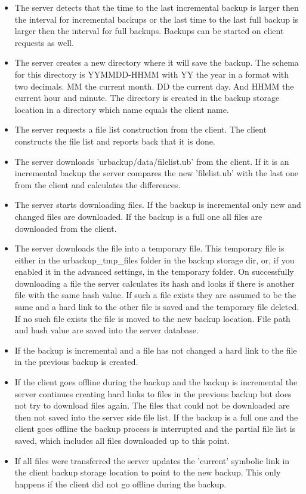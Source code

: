 \documentclass[a4paper,10pt]{article}
\begin{document}
\begin{itemize}
\item The server detects that the time to the last incremental backup is larger then the interval for incremental backups or the last time to the last full backup is larger then the interval for full backups. Backups can be started on client requests as well.
\item The server creates a new directory where it will save the backup. The schema for this directory is YYMMDD-HHMM with YY the year in a format with two decimals. MM the current month. DD the current day. And HHMM the current hour and minute. The directory is created in the backup storage location in a directory which name equals the client name.
\item The server requests a file list construction from the client. The client constructs the file list and reports back that it is done. 
\item The server downloads 'urbackup/data/filelist.ub' from the client. If it is an incremental backup the server compares the new 'filelist.ub' with the last one from the client and calculates the differences.
\item The server starts downloading files. If the backup is incremental only new and changed files are downloaded. If the backup is a full one all files are downloaded from the client.
\item The server downloads the file into a temporary file. This temporary file is either in the
urbackup\_tmp\_files folder in the backup storage dir, or, if you enabled it in the advanced
settings, in the temporary folder.
On successfully downloading a file the server calculates its hash and looks if there is another file with the same hash value.
If such a file exists they are assumed to be the same and a hard link to the other file is saved and the temporary file deleted. If no such file exists the file is moved to the new backup location. File path and hash value are saved into the server database.
\item If the backup is incremental and a file has not changed a hard link to the file in the previous backup is created.
\item If the client goes offline during the backup and the backup is incremental the server continues creating hard links to files in the previous backup but does not try to download files again. The files that could not be downloaded are then not saved into the server side file list. If the backup is a full one and the client goes offline the backup process is interrupted and the partial file list is saved, which includes all files downloaded up to this point.
\item If all files were transferred the server updates the 'current' symbolic link in the client backup storage location to point to the new backup. This only happens if the client did not go offline during the backup.
\end{itemize}
\end{document}
